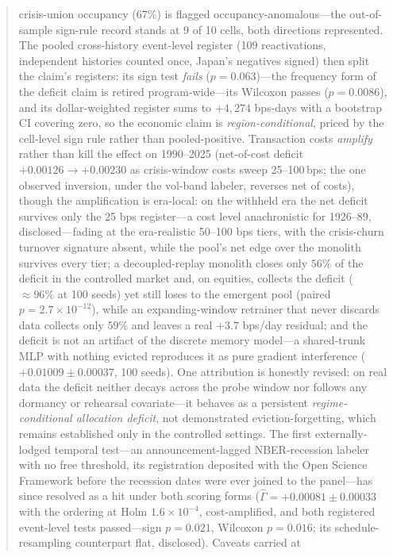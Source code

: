 \documentclass{article}
\begin{document}
\begin{abstract}
crisis-union occupancy ($67\%$) is flagged occupancy-anomalous---the
out-of-sample sign-rule record stands at 9 of 10 cells, both
directions represented. The pooled cross-history event-level
register (109 reactivations, independent histories counted once,
Japan's negatives signed) then split the claim's registers: its
sign test \emph{fails} ($p{=}0.063$)---the frequency form of the
deficit claim is retired program-wide---its Wilcoxon passes
($p{=}0.0086$), and its dollar-weighted register sums to
$+4{,}274$ bps-days with a bootstrap CI covering zero, so the
economic claim is \emph{region-conditional}, priced by the
cell-level sign rule rather than pooled-positive. Transaction costs
\emph{amplify} rather than kill the effect on 1990--2025
(net-of-cost deficit
$+0.00126 \to +0.00230$ as crisis-window costs sweep 25--100\,bps;
the one observed inversion, under the vol-band labeler, reverses net
of costs), though the amplification is era-local: on the withheld
era the net deficit survives only the 25 bps register---a cost
level anachronistic for 1926--89, disclosed---fading at the
era-realistic 50--100 bps tiers, with the crisis-churn turnover
signature absent, while the pool's net edge over the monolith
survives every tier; a decoupled-replay monolith closes only $56\%$ of the
deficit in the controlled market and, on equities, collects the
deficit (${\approx}96\%$ at 100 seeds) yet still loses to the
emergent pool (paired $p{=}2.7{\times}10^{-12}$), while an
expanding-window retrainer that never discards data collects only
$59\%$ and leaves a real $+3.7$ bps/day residual; and the
deficit is not an artifact of the discrete memory model---a shared-trunk
MLP with nothing evicted reproduces it as pure gradient interference
($+0.01009 \pm 0.00037$, 100 seeds). One attribution is honestly
revised: on real data the deficit neither decays across the probe
window nor follows any dormancy or rehearsal covariate---it behaves as
a persistent \emph{regime-conditional allocation deficit}, not
demonstrated eviction-forgetting, which remains established only in
the controlled settings. The first externally-lodged temporal
test---an announcement-lagged NBER-recession labeler with no free
threshold, its registration deposited with the Open Science Framework
before the recession dates were ever joined to the panel---has since
resolved as a hit under both scoring forms
($\hat\Gamma = +0.00081 \pm 0.00033$ with the ordering at Holm
$1.6\times10^{-4}$, cost-amplified, and both registered event-level
tests passed---sign $p{=}0.021$, Wilcoxon $p{=}0.016$; its
schedule-resampling counterpart flat, disclosed). Caveats carried at

\end{abstract}
\end{document}
